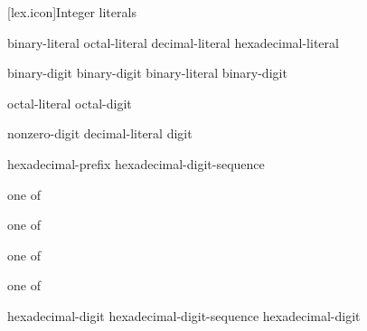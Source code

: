 [lex.icon]{Integer literals}

%
\begin{bnf}
\br
    binary-literal \br
    octal-literal \br
    decimal-literal \br
    hexadecimal-literal 
\end{bnf}

\begin{bnf}
\br
     binary-digit\br
     binary-digit\br
    binary-literal  binary-digit
\end{bnf}

\begin{bnf}
\br
    \br
    octal-literal  octal-digit
\end{bnf}

\begin{bnf}
\br
    nonzero-digit\br
    decimal-literal  digit
\end{bnf}

\begin{bnf}
\br
    hexadecimal-prefix hexadecimal-digit-sequence
\end{bnf}

\begin{bnf}
 \textnormal{one of}\br
\end{bnf}

\begin{bnf}
 \textnormal{one of}\br
\end{bnf}

\begin{bnf}
 \textnormal{one of}\br
\end{bnf}

\begin{bnf}
 \textnormal{one of}\br
\end{bnf}

\begin{bnf}
\br
    hexadecimal-digit\br
    hexadecimal-digit-sequence  hexadecimal-digit
\end{bnf}

